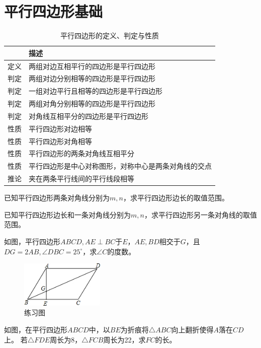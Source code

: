 \documentclass{ecnuthesis}
\begin{document}
\section{平行四边形基础}
\begin{table}[H]
\centering
\caption{平行四边形的定义、判定与性质}
\begin{tabular}{|l|l|}
\hline
    & 描述 \\
\hline
定义 & 两组对边互相平行的四边形是平行四边形 \\
\hline
判定 & 两组对边分别相等的四边形是平行四边形 \\
\hline
判定 & 一组对边平行且相等的四边形是平行四边形 \\
\hline
判定 & 两组对角分别相等的四边形是平行四边形 \\
\hline
判定 & 对角线互相平分的四边形是平行四边形 \\
\hline
性质 & 平行四边形对边相等 \\
\hline
性质 & 平行四边形对角相等 \\
\hline
性质 & 平行四边形的两条对角线互相平分 \\
\hline
性质 & 平行四边形是中心对称图形，对称中心是两条对角线的交点 \\
\hline
推论 & 夹在两条平行线间的平行线段相等 \\
\hline
\end{tabular}
\end{table}
\begin{problem}
    已知平行四边形两条对角线分别为$m,n$，求平行四边形边长的取值范围。
\end{problem}
\begin{problem}
    已知平行四边形边长和一条对角线分别为$m,n$，求平行四边形另一条对角线的取值范围。
\end{problem}
\begin{problem}
    如图，平行四边形$ABCD,AE\perp BC$于$E$，$AE,BD$相交于$G$，且$DG=2AB,\angle DBC=25^\circ$，求$\angle C$的度数。
\end{problem}
\begin{figure}[H]
\centering
\includegraphics[width=4cm]{picture/603.png}
\caption{练习图}
\end{figure}
\begin{problem}
    如图，在平行四边形$ABCD$中，以$BE$为折痕将$\triangle ABC$向上翻折使得$A$落在$CD$上。
    若$\triangle FDE$周长为8，$\triangle FCB$周长为22，求$FC$的长。
\end{problem}
\end{document}
